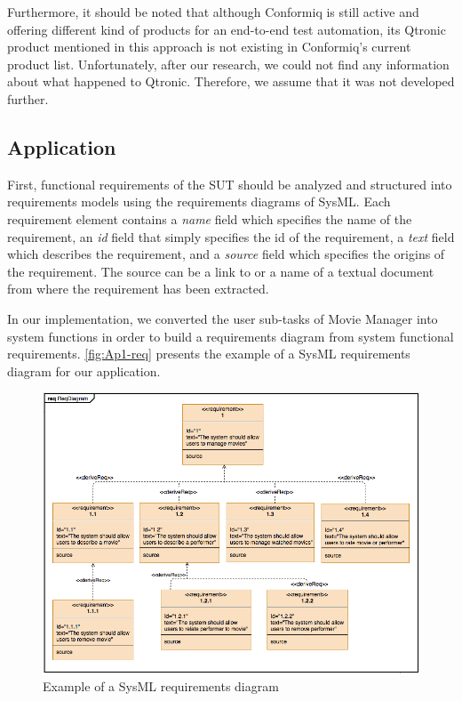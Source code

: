 Furthermore, it should be noted that although Conformiq is still active and offering different kind of products for an end-to-end test automation, its Qtronic product mentioned in this approach is not existing in Conformiq's current product list. Unfortunately, after our research, we could not find any information about what happened to Qtronic. Therefore, we assume that it was not developed further.





\subsection{Application}

First, functional requirements of the SUT should be analyzed and structured into requirements models using the requirements diagrams of SysML. Each requirement element contains a \textit{name} field which specifies the name of the requirement, an \textit{id} field that simply specifies the id of the requirement, a \textit{text} field which describes the requirement, and a \textit{source} field which specifies the origins of the requirement. The source can be a link to or a name of a textual document from where the requirement has been extracted. 

In our implementation, we converted the user sub-tasks of Movie Manager into system functions in order to build a requirements diagram from system functional requirements. \autoref{fig:Ap1-req} presents the example of a SysML requirements diagram for our application. 


\begin{figure} [h] 
\centering
\includegraphics[scale=0.49]{../images/Ap1-req} 
\caption{Example of a SysML requirements diagram}
\label{fig:Ap1-req}
\end{figure}

